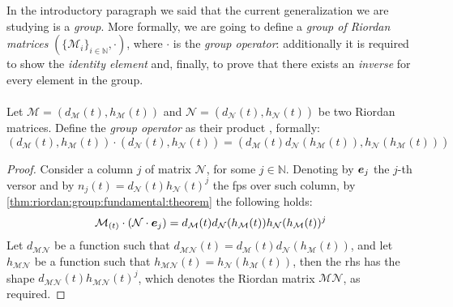 In the introductory paragraph we said that the current generalization
we are studying is a \emph{group}. More formally, we are going to define a 
\emph{group of Riordan matrices} $(\lbrace \mathcal{M}_{i}\rbrace_{i\in\mathbb{N}},\cdot)$, 
where $\cdot$ is the \emph{group
operator}: additionally it is required to show the \emph{identity element} and,
finally, to prove that there exists an \emph{inverse} for every element in the group.
\\\\
Let $\mathcal{M}=\left(d_{\mathcal{M}}(t),h_{\mathcal{M}}(t)\right)$ and
$\mathcal{N}=\left(d_{\mathcal{N}}(t),h_{\mathcal{N}}(t)\right)$ be two Riordan matrices.
Define the \emph{group operator} as their product
, formally:
\begin{displaymath}
    \left(d_{\mathcal{M}}(t),h_{\mathcal{M}}(t)\right)\cdot
        \left(d_{\mathcal{N}}(t),h_{\mathcal{N}}(t)\right) = 
        \left(d_{\mathcal{M}}(t)d_{\mathcal{N}}(h_{\mathcal{M}}(t)),
            h_{\mathcal{N}}(h_{\mathcal{M}}(t))\right)
\end{displaymath}
\begin{proof}
    Consider a column $j$ of matrix $\mathcal{N}$,
    for some $j\in\mathbb{N}$. Denoting by $\boldsymbol{e}_{j}$ the $j$-th versor and
    by $n_{j}(t)=d_{\mathcal{N}}(t)h_{\mathcal{N}}(t)^{j}$ the \ac{fps} over such column, 
    by \autoref{thm:riordan:group:fundamental:theorem} the following holds:
    \begin{displaymath}
        \mathcal{M}_{(t)}\cdot\left(\mathcal{N}\cdot\boldsymbol{e}_{j}\right)
            = d_{\mathcal{M}}(t) d_{\mathcal{N}}(h_{\mathcal{M}}(t))
                h_{\mathcal{N}}(h_{\mathcal{M}}(t))^{j}
    \end{displaymath}
    Let $d_{\mathcal{M}\mathcal{N}}$ be a function such that 
    $d_{\mathcal{M}\mathcal{N}}(t)=d_{\mathcal{M}}(t) d_{\mathcal{N}}( h_{\mathcal{M}}(t))$,
    and let $h_{\mathcal{M}\mathcal{N}}$ be a function such that 
    $h_{\mathcal{M}\mathcal{N}}(t)=h_{\mathcal{N}}(h_{\mathcal{M}}(t))$, then the \ac{rhs}
    has the shape
    $d_{\mathcal{M}\mathcal{N}}(t)h_{\mathcal{M}\mathcal{N}}(t)^{j}$, which denotes the
    Riordan matrix $\mathcal{M}\mathcal{N}$, as required.

\end{proof}

